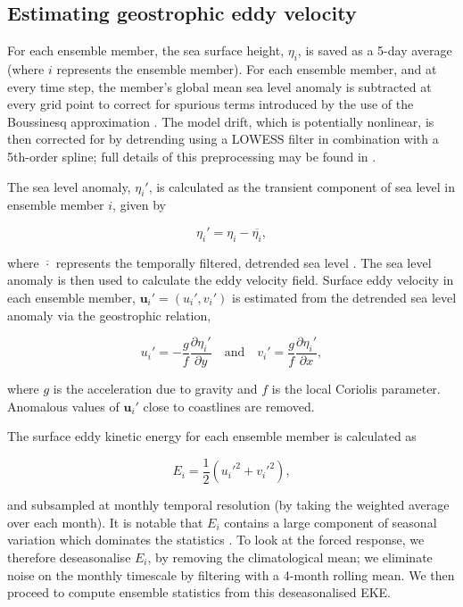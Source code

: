 \documentclass[linenumbers]{agujournal2019}
\begin{document}
\subsection{Estimating geostrophic eddy velocity}
For each ensemble member, the sea surface height, $\eta_i$, is saved as a 5-day average (where $i$ represents the ensemble member). 
For each ensemble member, and at every time step, the member's global mean sea level anomaly is subtracted at every grid point to correct for spurious terms introduced by the use of the Boussinesq approximation \citep{Greatbatch1994}. 
The model drift, which is potentially nonlinear, is then corrected for by detrending using a LOWESS filter \citep{Cleveland1979} in combination with a 5th-order spline; full details of this preprocessing may be found in \cite{Close2020}.

The sea level anomaly, $\eta_i'$, is calculated as the transient component of sea level in ensemble member $i$, given by 
\begin{linenomath*}
\begin{equation}
\eta_i' = \eta_i - \overline{\eta_i},
\end{equation}
\end{linenomath*}
where $\overline{\cdot}$ represents the temporally filtered, detrended sea level \citep{Close2020}.
The sea level anomaly is then used to calculate the eddy velocity field.
Surface eddy velocity in each ensemble member, $\mathbf{u}_i' = (u_i', v_i')$ is estimated from the detrended sea level anomaly via the geostrophic relation,
\begin{linenomath*}
\begin{equation}
u_i' = - \frac{g}{f} \frac{\partial \eta_i'}{\partial y} \quad \text{and} \quad v_i' = \frac{g}{f} \frac{\partial \eta_i'}{\partial x},
\end{equation}
\end{linenomath*}
where $g$ is the acceleration due to gravity and $f$ is the local Coriolis parameter.
Anomalous values of $\mathbf{u}_i'$ close to coastlines are removed.

The surface eddy kinetic energy for each ensemble member is calculated as 
\begin{linenomath*}
\begin{equation}
E_i = \frac{1}{2}(u_i'^2 + v_i'^2),
\end{equation}
\end{linenomath*}
and subsampled at monthly temporal resolution (by taking the weighted average over each month).
It is notable that $E_i$ contains a large component of seasonal variation which dominates the statistics \citep{Martinez-Moreno2022}.
To look at the forced response, we therefore deseasonalise $E_i$, by removing the climatological mean; we eliminate noise on the monthly timescale by filtering with a 4-month rolling mean.
We then proceed to compute ensemble statistics from this deseasonalised EKE.
\end{document}
